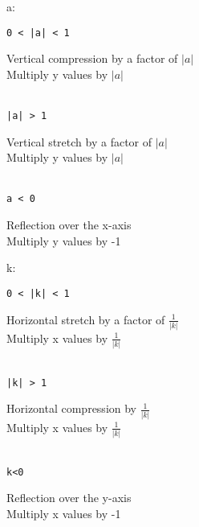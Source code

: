\documentclass{article}
\begin{document}
\begin{multicols}{2}

\noindent
a:

\begin{verbatim}
0 < |a| < 1
\end{verbatim}

\noindent
Vertical compression by a factor of $|a|$\\
Multiply y values by $|a|$\\\\

\begin{verbatim}
|a| > 1
\end{verbatim}

\noindent
Vertical stretch by a factor of $|a|$\\
Multiply y values by $|a|$\\\\

\begin{verbatim}
a < 0
\end{verbatim}

\noindent
Reflection over the x-axis\\
Multiply y values by -1\\

\columnbreak

\noindent
k:

\begin{verbatim}
0 < |k| < 1
\end{verbatim}

\noindent
Horizontal stretch by a factor of $\frac{1}{|k|}$\\
Multiply x values by $\frac{1}{|k|}$\\\\

\begin{verbatim}
|k| > 1
\end{verbatim}

\noindent
Horizontal compression by $\frac{1}{|k|}$\\
Multiply x values by $\frac{1}{|k|}$\\\\

\begin{verbatim}
k<0
\end{verbatim}

\noindent
Reflection over the y-axis\\
Multiply x values by -1\\\\

\end{multicols}
\end{document}
